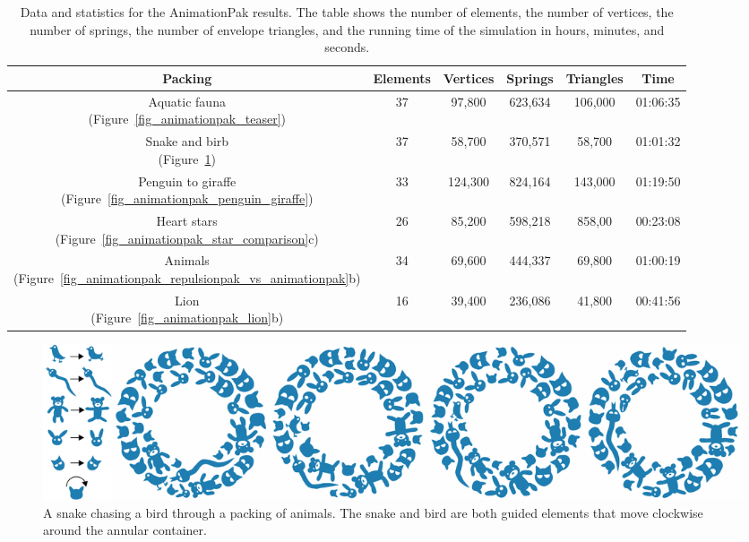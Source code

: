 \begin{table}[]
\centering 
\caption[Data and statistics for the AnimationPak results]
{
   Data and statistics for the AnimationPak results.  The table shows the
   number of elements,
   the number of vertices, 
   the number of springs, 
    the number of envelope triangles, and 
   the running time of the simulation in hours, minutes, and seconds.
   }
\label{table_packing_statistics}
\begin{tabular}{|c|c|c|c|c|c|}
\hline
	\cellcolor{lg}Packing &
	\cellcolor{lg}Elements &
	\cellcolor{lg}Vertices & 
	\cellcolor{lg}Springs &
	\cellcolor{lg}Triangles &
	\cellcolor{lg}Time \\ \hline
\makecell{Aquatic fauna  \\ (Figure~\ref{fig_animationpak_teaser})}  
& 37         & 97,800             & 623,634            & 106,000		& 01:06:35        
\\ \hline
\makecell{Snake and birb     \\ (Figure~\ref{fig_animationpak_chasing_bird})}  
& 37         & 58,700             & 370,571            & 58,700		& 01:01:32        
\\ \hline
\makecell{Penguin to giraffe \\ (Figure~\ref{fig_animationpak_penguin_giraffe})}  
& 33         & 124,300            & 824,164            & 143,000		& 01:19:50        
\\ \hline
\makecell{Heart stars         \\ (Figure~\ref{fig_animationpak_star_comparison}c)}  
& 26         & 85,200             & 598,218            & 858,00		& 00:23:08        
\\ \hline
\makecell{Animals            \\ (Figure~\ref{fig_animationpak_repulsionpak_vs_animationpak}b)}  
& 34         & 69,600             & 444,337            & 69,800		& 01:00:19        
\\ \hline
\makecell{Lion               \\ (Figure~\ref{fig_animationpak_lion}b)}  
& 16         & 39,400             & 236,086            & 41,800		& 00:41:56        
\\ \hline
\end{tabular}
\end{table}


\begin{figure}
\centering
\includegraphics[width=1.0\textwidth]{figures/animationpak/chasing_bird.pdf} 
\caption[An animated packing of a snake chases a bird]
{\label{fig_animationpak_chasing_bird} 
A snake chasing a bird through a packing of animals.  The snake and bird 
	are both guided elements that move clockwise around the annular 
	container.}
\end{figure}

